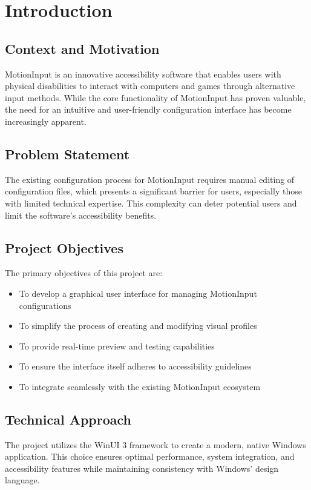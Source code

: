 \chapter{Introduction}

\section{Context and Motivation}
MotionInput is an innovative accessibility software that enables users with physical disabilities to interact with computers and games through alternative input methods. While the core functionality of MotionInput has proven valuable, the need for an intuitive and user-friendly configuration interface has become increasingly apparent.

\section{Problem Statement}
The existing configuration process for MotionInput requires manual editing of configuration files, which presents a significant barrier for users, especially those with limited technical expertise. This complexity can deter potential users and limit the software's accessibility benefits.

\section{Project Objectives}
The primary objectives of this project are:
\begin{itemize}
    \item To develop a graphical user interface for managing MotionInput configurations
    \item To simplify the process of creating and modifying visual profiles
    \item To provide real-time preview and testing capabilities
    \item To ensure the interface itself adheres to accessibility guidelines
    \item To integrate seamlessly with the existing MotionInput ecosystem
\end{itemize}

\section{Technical Approach}
The project utilizes the WinUI 3 framework to create a modern, native Windows application. This choice ensures optimal performance, system integration, and accessibility features while maintaining consistency with Windows' design language.

